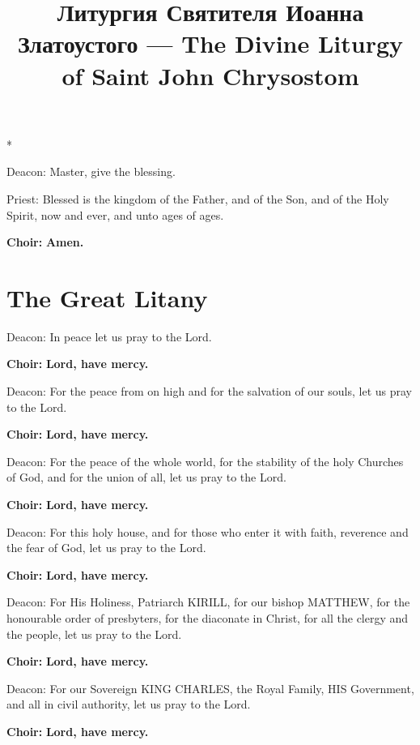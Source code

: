 \documentclass[12pt,a4paper,titlepage]{report}
\title {
  \selectlanguage{russian}Литургия Святителя Иоанна Златоустого ---
  \selectlanguage{english}The Divine Liturgy of Saint John Chrysostom
}
\author {}
\date{}
\begin{document}
\maketitle

\begin{paracol}[1]{2}

  \switchcolumn[0]*

  Deacon: Master, give the blessing.

  Priest: Blessed is the kingdom of the Father, and of the Son, and of the Holy Spirit, now and ever, and unto ages of ages.

  \textbf{Choir:} \textbf{Amen.}

  \section*{The Great Litany}

  Deacon: In peace let us pray to the Lord.

  \textbf{Choir:} \textbf{Lord, have mercy.}

  Deacon: For the peace from on high and for the salvation of our souls, let us pray to the Lord.

  \textbf{Choir:} \textbf{Lord, have mercy.}

  Deacon: For the peace of the whole world, for the stability of the holy Churches of God, and for the union of all, let us pray to the Lord.

  \textbf{Choir:} \textbf{Lord, have mercy.}

  Deacon: For this holy house, and for those who enter it with faith, reverence and the fear of God, let us pray to the Lord.

  \textbf{Choir:} \textbf{Lord, have mercy.}

  Deacon: For His Holiness, Patriarch KIRILL, for our bishop MATTHEW, for the honourable order of presbyters, for the diaconate in Christ, for all the clergy and the people, let us pray to the Lord.

  \textbf{Choir:} \textbf{Lord, have mercy.}

  Deacon: For our Sovereign KING CHARLES, the Royal Family, HIS Government, and all in civil authority, let us pray to the Lord.

  \textbf{Choir:} \textbf{Lord, have mercy.}


\end{paracol}
\end{document}
